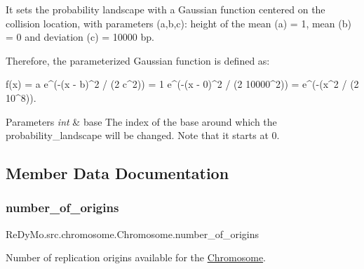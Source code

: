 It sets the probability landscape with a Gaussian function centered on the collision location, with parameters (a,b,c)\+: height of the mean (a) = 1, mean (b) = 0 and deviation (c) = 10000 bp.

Therefore, the parameterized Gaussian function is defined as\+: \begin{DoxyVerb}                                f(x) = a e^(-(x - b)^2 / (2 c^2))
                                     = 1 e^(-(x - 0)^2 / (2 10000^2))
                                     =   e^(-(x^2 / (2 10^8)).
\end{DoxyVerb}



\begin{DoxyParams}{Parameters}
{\em int} & base The index of the base around which the probability\+\_\+landscape will be changed. Note that it starts at 0. \\
\hline
\end{DoxyParams}


\subsection{Member Data Documentation}
\mbox{\label{classReDyMo_1_1src_1_1chromosome_1_1Chromosome_ab8d8356cc5954967b754feb3c5da8c16}} 
\subsubsection{\texorpdfstring{number\+\_\+of\+\_\+origins}{number\_of\_origins}}
{\footnotesize\ttfamily Re\+Dy\+Mo.\+src.\+chromosome.\+Chromosome.\+number\+\_\+of\+\_\+origins}



Number of replication origins available for the \mbox{\hyperlink{classReDyMo_1_1src_1_1chromosome_1_1Chromosome}{Chromosome}}. 

\mbox{\label{classReDyMo_1_1src_1_1chromosome_1_1Chromosome_a0ce8da5c0773f1d5d6e668b26d498875}} 
